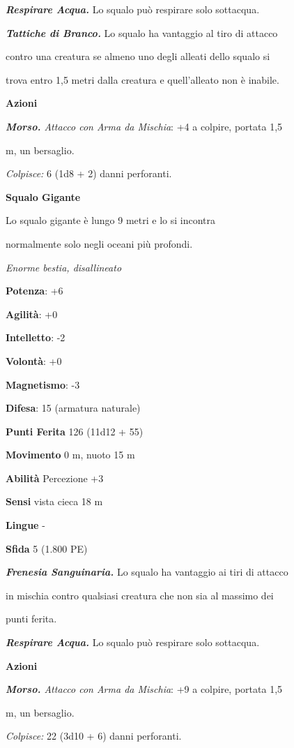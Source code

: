 \begin{multicols}{2}
\emph{\textbf{Respirare Acqua.}} Lo squalo può respirare solo sottacqua.

\emph{\textbf{Tattiche di Branco.}} Lo squalo ha vantaggio al tiro di
attacco

contro una creatura se almeno uno degli alleati dello squalo si

trova entro 1,5 metri dalla creatura e quell'alleato non è inabile.

\textbf{Azioni}

\emph{\textbf{Morso.} Attacco con Arma da Mischia}: +4 a colpire,
portata 1,5

m, un bersaglio.

\emph{Colpisce:} 6 (1d8 + 2) danni perforanti.

\textbf{Squalo Gigante}

Lo squalo gigante è lungo 9 metri e lo si incontra

normalmente solo negli oceani più profondi.

\emph{Enorme bestia, disallineato}

\textbf{Potenza}: +6

\textbf{Agilità}: +0

\textbf{Intelletto}: -2

\textbf{Volontà}: +0

\textbf{Magnetismo}: -3

\textbf{Difesa}: 15 (armatura naturale)

\textbf{Punti Ferita} 126 (11d12 + 55)

\textbf{Movimento} 0 m, nuoto 15 m

\textbf{Abilità} Percezione +3

\textbf{Sensi} vista cieca 18 m

\textbf{Lingue} -

\textbf{Sfida} 5 (1.800 PE)

\emph{\textbf{Frenesia Sanguinaria.}} Lo squalo ha vantaggio ai tiri di
attacco

in mischia contro qualsiasi creatura che non sia al massimo dei

punti ferita.

\emph{\textbf{Respirare Acqua.}} Lo squalo può respirare solo sottacqua.

\textbf{Azioni}

\emph{\textbf{Morso.} Attacco con Arma da Mischia}: +9 a colpire,
portata 1,5

m, un bersaglio.

\emph{Colpisce:} 22 (3d10 + 6) danni perforanti.




\end{multicols}
